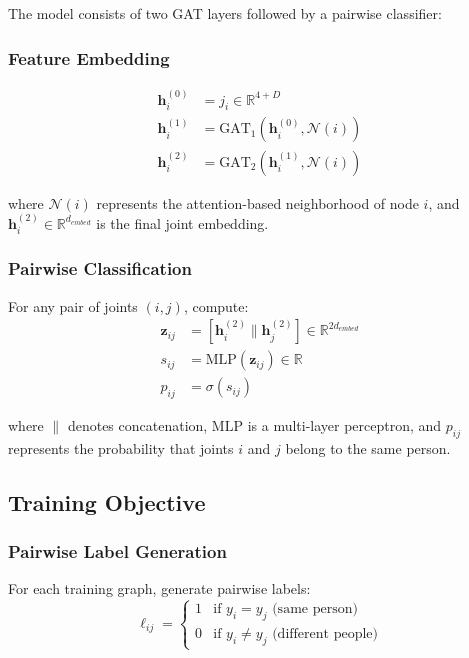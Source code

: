 The model consists of two GAT layers followed by a pairwise classifier:

\subsubsection{Feature Embedding}
\begin{align}
\mathbf{h}_i^{(0)} &= j_i \in \mathbb{R}^{4+D} \\
\mathbf{h}_i^{(1)} &= \text{GAT}_1(\mathbf{h}_i^{(0)}, \mathcal{N}(i)) \\
\mathbf{h}_i^{(2)} &= \text{GAT}_2(\mathbf{h}_i^{(1)}, \mathcal{N}(i))
\end{align}

where $\mathcal{N}(i)$ represents the attention-based neighborhood of node $i$, and $\mathbf{h}_i^{(2)} \in \mathbb{R}^{d_{embed}}$ is the final joint embedding.

\subsubsection{Pairwise Classification}
For any pair of joints $(i,j)$, compute:
\begin{align}
\mathbf{z}_{ij} &= [\mathbf{h}_i^{(2)} \parallel \mathbf{h}_j^{(2)}] \in \mathbb{R}^{2d_{embed}} \\
s_{ij} &= \text{MLP}(\mathbf{z}_{ij}) \in \mathbb{R} \\
p_{ij} &= \sigma(s_{ij})
\end{align}

where $\parallel$ denotes concatenation, $\text{MLP}$ is a multi-layer
perceptron, and $p_{ij}$ represents the probability that joints $i$ and $j$
belong to the same person.

\subsection{Training Objective}

\subsubsection{Pairwise Label Generation}
For each training graph, generate pairwise labels:
\begin{equation}
\ell_{ij} = \begin{cases}
1 & \text{if } y_i = y_j \text{ (same person)} \\
0 & \text{if } y_i \neq y_j \text{ (different people)}
\end{cases}
\end{equation}

